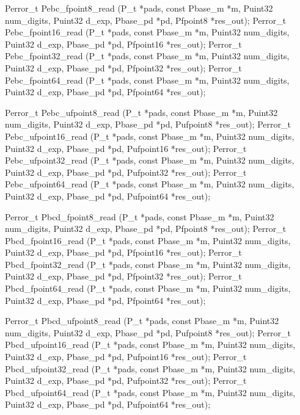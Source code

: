 \cBegin{}
\cEnd{}

\begin{tinycodeaux}{\leftmargin=0in}
\codeallowbreaks
Perror_t Pebc_fpoint8_read   (P_t *pads, const Pbase_m *m, Puint32 num_digits, Puint32 d_exp,
			      Pbase_pd *pd, Pfpoint8 *res_out);
Perror_t Pebc_fpoint16_read  (P_t *pads, const Pbase_m *m, Puint32 num_digits, Puint32 d_exp,
			      Pbase_pd *pd, Pfpoint16 *res_out);
Perror_t Pebc_fpoint32_read  (P_t *pads, const Pbase_m *m, Puint32 num_digits, Puint32 d_exp,
			      Pbase_pd *pd, Pfpoint32 *res_out);
Perror_t Pebc_fpoint64_read  (P_t *pads, const Pbase_m *m, Puint32 num_digits, Puint32 d_exp,
			      Pbase_pd *pd, Pfpoint64 *res_out);

Perror_t Pebc_ufpoint8_read  (P_t *pads, const Pbase_m *m, Puint32 num_digits, Puint32 d_exp,
			      Pbase_pd *pd, Pufpoint8 *res_out);
Perror_t Pebc_ufpoint16_read (P_t *pads, const Pbase_m *m, Puint32 num_digits, Puint32 d_exp,
			      Pbase_pd *pd, Pufpoint16 *res_out);
Perror_t Pebc_ufpoint32_read (P_t *pads, const Pbase_m *m, Puint32 num_digits, Puint32 d_exp,
			      Pbase_pd *pd, Pufpoint32 *res_out);
Perror_t Pebc_ufpoint64_read (P_t *pads, const Pbase_m *m, Puint32 num_digits, Puint32 d_exp,
			      Pbase_pd *pd, Pufpoint64 *res_out);

Perror_t Pbcd_fpoint8_read   (P_t *pads, const Pbase_m *m, Puint32 num_digits, Puint32 d_exp,
			      Pbase_pd *pd, Pfpoint8 *res_out);
Perror_t Pbcd_fpoint16_read  (P_t *pads, const Pbase_m *m, Puint32 num_digits, Puint32 d_exp,
			      Pbase_pd *pd, Pfpoint16 *res_out);
Perror_t Pbcd_fpoint32_read  (P_t *pads, const Pbase_m *m, Puint32 num_digits, Puint32 d_exp,
			      Pbase_pd *pd, Pfpoint32 *res_out);
Perror_t Pbcd_fpoint64_read  (P_t *pads, const Pbase_m *m, Puint32 num_digits, Puint32 d_exp,
			      Pbase_pd *pd, Pfpoint64 *res_out);

Perror_t Pbcd_ufpoint8_read  (P_t *pads, const Pbase_m *m, Puint32 num_digits, Puint32 d_exp,
			      Pbase_pd *pd, Pufpoint8 *res_out);
Perror_t Pbcd_ufpoint16_read (P_t *pads, const Pbase_m *m, Puint32 num_digits, Puint32 d_exp,
			      Pbase_pd *pd, Pufpoint16 *res_out);
Perror_t Pbcd_ufpoint32_read (P_t *pads, const Pbase_m *m, Puint32 num_digits, Puint32 d_exp,
			      Pbase_pd *pd, Pufpoint32 *res_out);
Perror_t Pbcd_ufpoint64_read (P_t *pads, const Pbase_m *m, Puint32 num_digits, Puint32 d_exp,
			      Pbase_pd *pd, Pufpoint64 *res_out);

\end{tinycodeaux}
